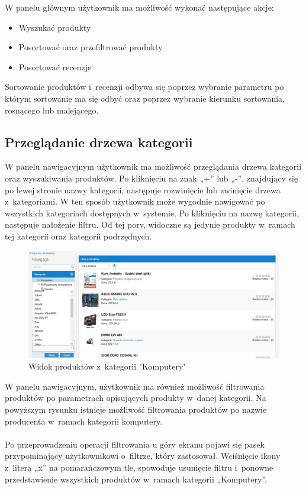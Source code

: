 W panelu głównym użytkownik ma możliwość wykonać następujące akcje:

\begin{itemize}
\item Wyszukać produkty
\item Posortować oraz przefiltrować produkty
\item Posortować recenzje
\end{itemize}

Sortowanie produktów i~recenzji odbywa się poprzez wybranie parametru po którym sortowanie ma się odbyć oraz poprzez wybranie kierunku sortowania, rosnącego lub malejącego.

\subsection{Przeglądanie drzewa kategorii}

W panelu nawigacyjnym użytkownik ma możliwość przeglądania drzewa kategorii oraz wyszukiwania produktów. Po kliknięciu na znak „+” lub „-”, znajdujący się po lewej stronie nazwy kategorii, następuje rozwinięcie lub zwinięcie drzewa z~kategoriami. W ten sposób użytkownik może wygodnie nawigować po wszystkich kategoriach dostępnych w~systemie. Po kliknięciu na nazwę kategorii, następuje nałożenie filtru. Od tej pory, widoczne są jedynie produkty w~ramach tej kategorii oraz kategorii podrzędnych.

\begin{figure}[h]
	\centering
	\includegraphics[width=1.00\textwidth]{images/filtr_kategorii.png}
	\caption{Widok produktów z~kategorii "Komputery"}
\end{figure}

W panelu nawigacyjnym, użytkownik ma również możliwość filtrowania produktów po parametrach opisujących produkty w~danej kategorii. Na powyższym rysunku istnieje możliwość filtrowania produktów po nazwie producenta w~ramach kategorii komputery.
\paragraph{}
Po przeprowadzeniu operacji filtrowania u góry ekranu pojawi się pasek przypominający użytkownikowi o~filtrze, który zastosował. Wciśnięcie ikony z~literą „x” na pomarańczowym tle, spowoduje usunięcie filtru i~ponowne przedstawienie wszystkich produktów w~ramach kategorii „Komputery”.

